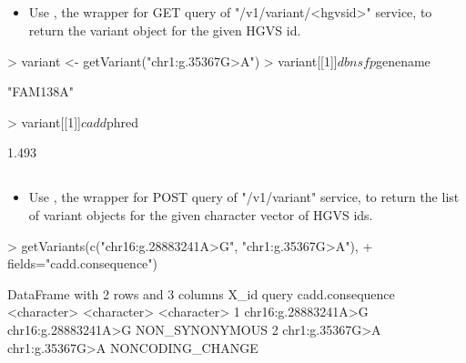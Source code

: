 \documentclass[12pt]{article}
\begin{document}
\subsection{}

\begin{itemize}
\item Use , the wrapper for GET query of "/v1/variant/<hgvsid>" service, to return the variant object for the given HGVS id.
\end{itemize} 


\begin{Schunk}
\begin{Sinput}
> variant <- getVariant("chr1:g.35367G>A")
> variant[[1]]$dbnsfp$genename
\end{Sinput}
\begin{Soutput}
[1] "FAM138A"
\end{Soutput}
\begin{Sinput}
> variant[[1]]$cadd$phred
\end{Sinput}
\begin{Soutput}
[1] 1.493
\end{Soutput}
\end{Schunk}

\subsection{}

\begin{itemize}
\item Use , the wrapper for POST query of "/v1/variant" service, to return the list of variant objects for the given character vector of HGVS ids.
\end{itemize} 


\begin{Schunk}
\begin{Sinput}
> getVariants(c("chr16:g.28883241A>G", "chr1:g.35367G>A"),
+             fields="cadd.consequence")
\end{Sinput}
\begin{Soutput}
DataFrame with 2 rows and 3 columns
                 X_id               query cadd.consequence
          <character>         <character>      <character>
1 chr16:g.28883241A>G chr16:g.28883241A>G   NON_SYNONYMOUS
2     chr1:g.35367G>A     chr1:g.35367G>A NONCODING_CHANGE
\end{Soutput}
\end{Schunk}
\end{document}
